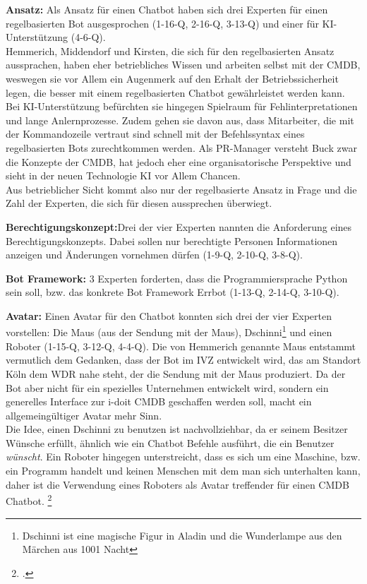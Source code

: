 \textbf{Ansatz:} Als Ansatz für einen Chatbot haben sich drei Experten für einen regelbasierten Bot ausgesprochen (1-16-Q, 2-16-Q, 3-13-Q) und einer für KI-Unterstützung (4-6-Q).\\
Hemmerich, Middendorf und Kirsten, die sich für den regelbasierten Ansatz aussprachen, haben eher betriebliches Wissen und arbeiten selbst mit der \acs{CMDB}, weswegen sie vor Allem ein Augenmerk auf den Erhalt der Betriebssicherheit legen, die besser mit einem regelbasierten Chatbot gewährleistet werden kann. Bei KI-Unterstützung befürchten sie hingegen Spielraum für Fehlinterpretationen und lange Anlernprozesse. Zudem gehen sie davon aus, dass Mitarbeiter, die mit der Kommandozeile vertraut sind schnell mit der Befehlssyntax eines regelbasierten Bots zurechtkommen werden. Als PR-Manager versteht Buck zwar die Konzepte der \acs{CMDB}, hat jedoch eher eine organisatorische Perspektive und sieht in der neuen Technologie KI vor Allem Chancen.\\
Aus betrieblicher Sicht kommt also nur der regelbasierte Ansatz in Frage und die Zahl der Experten, die sich für diesen aussprechen überwiegt. 

\textbf{Berechtigungskonzept:}Drei der vier Experten nannten die Anforderung eines Berechtigungskonzepts. Dabei sollen nur berechtigte Personen Informationen anzeigen und Änderungen vornehmen dürfen (1-9-Q, 2-10-Q, 3-8-Q).

\textbf{Bot Framework:} 3 Experten forderten, dass die Programmiersprache Python sein soll, bzw. das konkrete Bot Framework Errbot (1-13-Q, 2-14-Q, 3-10-Q).

\textbf{Avatar:} Einen Avatar für den Chatbot konnten sich drei der vier Experten vorstellen: Die Maus (aus der Sendung mit der Maus), Dschinni\footnote{Dschinni ist eine magische Figur in Aladin und die Wunderlampe aus den Märchen aus 1001 Nacht} und einen Roboter (1-15-Q, 3-12-Q, 4-4-Q). Die von Hemmerich genannte Maus entstammt vermutlich dem Gedanken, dass der Bot im \acs{IVZ} entwickelt wird, das am Standort Köln dem \acs{WDR} nahe steht, der die Sendung mit der Maus produziert. Da der Bot aber nicht für ein spezielles Unternehmen entwickelt wird, sondern ein generelles Interface zur i-doit \acs{CMDB} geschaffen werden soll, macht ein allgemeingültiger Avatar mehr Sinn.\\
Die Idee, einen Dschinni zu benutzen ist nachvollziehbar, da er seinem Besitzer Wünsche erfüllt, ähnlich wie ein Chatbot Befehle ausführt, die ein Benutzer \textit{wünscht}. Ein Roboter hingegen unterstreicht, dass es sich um eine Maschine, bzw. ein Programm handelt und keinen Menschen mit dem man sich unterhalten kann, daher ist die Verwendung eines Roboters als Avatar treffender für einen \acs{CMDB} Chatbot.
\footcite[Vgl.][o. \pno]{WDR_Maus}

